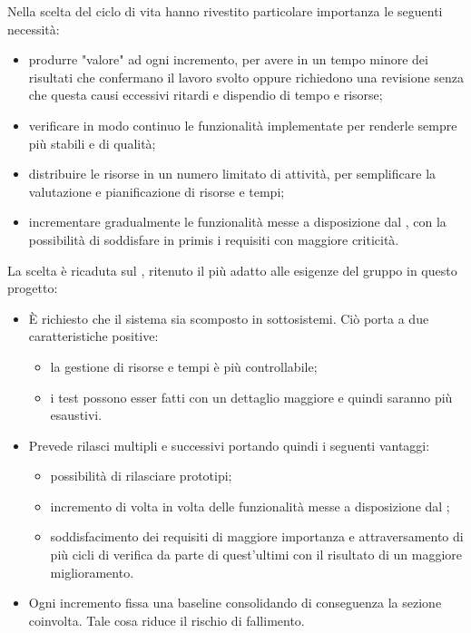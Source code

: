 		Nella scelta del ciclo di vita hanno rivestito particolare importanza le seguenti necessità:
		\begin{itemize}
			\item produrre "valore" ad ogni incremento, per avere in un tempo minore dei risultati che confermano il lavoro svolto oppure richiedono una revisione senza che questa causi eccessivi ritardi e dispendio di tempo e risorse;
			\item verificare in modo continuo le funzionalità implementate per renderle sempre più stabili e di qualità;
			\item distribuire le risorse in un numero limitato di attività, per semplificare la valutazione e pianificazione di risorse e tempi;
			\item incrementare gradualmente le funzionalità messe a disposizione dal , con la possibilità di soddisfare in primis i requisiti con maggiore criticità.\\
		\end{itemize}
		
		La scelta è ricaduta sul \underline{}, ritenuto il più adatto alle esigenze del gruppo in questo progetto:
		\begin{itemize}
			\item È richiesto che il sistema sia scomposto in sottosistemi. Ciò porta a due caratteristiche positive:
			\begin{itemize}
				\item la gestione di risorse e tempi è più controllabile;
				\item i test possono esser fatti con un dettaglio maggiore e quindi saranno più esaustivi.
			\end{itemize}
			\item Prevede rilasci multipli e successivi portando quindi i seguenti vantaggi:
			\begin{itemize}
				\item possibilità di rilasciare prototipi;
				\item incremento di volta in volta delle funzionalità messe a disposizione dal ;
				\item soddisfacimento dei requisiti di maggiore importanza e attraversamento di più cicli di verifica da parte di quest'ultimi con il risultato di un maggiore miglioramento.
			\end{itemize}
			\item Ogni incremento fissa una baseline consolidando di conseguenza la sezione coinvolta. Tale cosa riduce il rischio di fallimento.
		\end{itemize}

